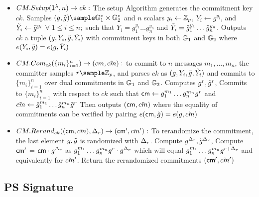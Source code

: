 \begin{itemize}
    \item $CM.Setup(\mathsf{1^{\lambda}}, n) \to ck:$ The setup Algorithm generates the commitment key $ck$. Samples $(g, \tilg) \sample \G_1^* \times \G_2^*$ and $n$ scalars $y_i \gets \mathbb{Z}_p$, $Y_i \gets g^{y_i}$, and $\tilde{Y}_i \gets \tilde{g}^{y_i}$ $\forall \; 1 \leq i \leq n;$ such that $Y_i = g_1^{y_1}\dots g_n^{y_n}$ and $\tilde{Y}_i = \tilde{g}_1^{y_1}\dots \tilde{g}_n^{y_n}$. Outputs $ck$ a tuple $(g, Y_i, \tilde{g}, \tilde{Y}_i)$ with commitment keys in both $\mathbb{G}_1$ and $\mathbb{G}_2$ where $e(Y_i,\tilde{g}) = e(g,\tilde{Y}_i)$

    \item $CM.Com_{ck}(\{m_i\}^n_{i=1}) \to (cm, \tilde{cm}):$ to commit to $n$ messages $m_1, \dots, m_n$, the committer samples $r \sample \Zp$, and parses $ck$ as $(g, Y_i, \tilde{g}, \tilde{Y}_i)$ and commits to $\{m_i\}^n_{i=1}$ over dual commitments in $\mathbb{G}_1$ and $\mathbb{G}_2$. Computes $g^r, \tilde{g}^r$, Commits to $\{m_i\}^n_{i=1}$ with respect to $ck$ such that $\mathsf{cm} \gets g_1^{m_1}\dots g_n^{m_n} g^r$ and $\tilde{cm} \gets \tilde{g}_1^{m_1} \dots \tilde{g}_n^{m_n}\tilde{g}^r$ Then outputs $(\mathsf{cm}, \tilde{cm})$ where the equality of commitments can be verified by pairing $e(\mathsf{cm}, \tilde{g}) = e(g, \tilde{cm})$
    
    \item $CM.Rerand_{ck}((\mathsf{cm}, \tilde{cm}), \Delta_r) \to (\mathsf{cm}', \tilde{cm}'):$ To rerandomize the commitment, the last element $g, \tilde{g}$ is randomized with $\Delta_r$. Compute $g^{\Delta_r}, \tilde{g}^{\Delta_r}$, Compute $\mathsf{cm}'$ = $\mathsf{cm} \cdot g^{\Delta_r}$ as $g_1^{m_1}\dots g_n^{m_n} g^r \cdot g^{\Delta_r}$ which will equal $g_1^{m_1}\dots g_n^{m_n} g^{r + \Delta_r}$ and equivalently for $\tilde{cm}'$. Return the rerandomized commitments $(\mathsf{cm}', \tilde{cm}')$
    
\end{itemize}


\subsection{PS Signature}
